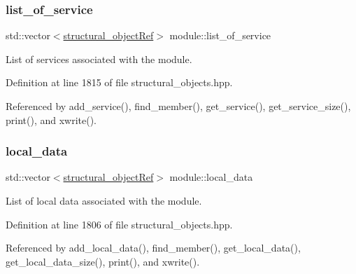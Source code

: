 \mbox{\label{classmodule_aad1399af2e7d2c801d32cd6cac605876}} 
\subsubsection{\texorpdfstring{list\+\_\+of\+\_\+service}{list\_of\_service}}
{\footnotesize\ttfamily std\+::vector$<$\hyperlink{structural__objects_8hpp_a8ea5f8cc50ab8f4c31e2751074ff60b2}{structural\+\_\+object\+Ref}$>$ module\+::list\+\_\+of\+\_\+service\hspace{0.3cm}{\ttfamily [private]}}



List of services associated with the module. 



Definition at line 1815 of file structural\+\_\+objects.\+hpp.



Referenced by add\+\_\+service(), find\+\_\+member(), get\+\_\+service(), get\+\_\+service\+\_\+size(), print(), and xwrite().

\mbox{\label{classmodule_a8b44d9d75fa61b8dd0fc7d7859b59274}} 
\subsubsection{\texorpdfstring{local\+\_\+data}{local\_data}}
{\footnotesize\ttfamily std\+::vector$<$\hyperlink{structural__objects_8hpp_a8ea5f8cc50ab8f4c31e2751074ff60b2}{structural\+\_\+object\+Ref}$>$ module\+::local\+\_\+data\hspace{0.3cm}{\ttfamily [private]}}



List of local data associated with the module. 



Definition at line 1806 of file structural\+\_\+objects.\+hpp.



Referenced by add\+\_\+local\+\_\+data(), find\+\_\+member(), get\+\_\+local\+\_\+data(), get\+\_\+local\+\_\+data\+\_\+size(), print(), and xwrite().

\mbox{\label{classmodule_ac0faccd6dc63796440930ecd8dcb55a0}} 
